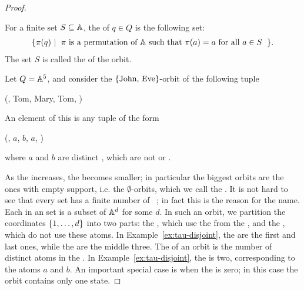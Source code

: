 \begin{proof}
\begin{definition}[Orbit] \label{def:orbit}
  \AP
  For a finite set $S \subseteq \mathbb A$, the  of $q \in Q$ is the following set:
    \begin{align*}
    \setbuild{ \pi(q)}{$\pi$ is a permutation of $\atoms$ such that $\pi(a)=a$ for all $a \in S$}.
    \end{align*}
  The set $S$ is called the  of the orbit.
\end{definition}

\begin{myexample}\label{ex:tau-disjoint}
    Let $Q = \mathbb A^5$, and consider the $\{\text{{John}, {Eve}}\}$-orbit of the following tuple
    \begin{center}
        (, Tom, Mary, Tom, )
    \end{center}
    An element of this  is any tuple of the form 
    \begin{center}
        (, $a$, $b$, $a$, )
    \end{center}
    where $a$ and $b$ are distinct , which are not  or . 
\end{myexample}

\AP As the  increases, the  becomes smaller; in
particular the biggest orbits are the ones with empty support, i.e. the
$\emptyset$-orbits, which we call the . It is not
hard to see that every  set has a finite number of
~\cite[Lemma 1.4]{bojanczyk_slightly}; in fact this is
the reason for the name. Each  in an  set is a
subset of $\mathbb A^d$ for some $d$. In such an orbit, we partition the
coordinates $\{1,\ldots,d\}$ into two parts: the ,
which use the  from the , and the , which do not use these atoms. In Example~\ref{ex:tau-disjoint},
the  are  the first and last ones, while the  are the middle three. The  of an
orbit is the number of distinct atoms in the . In
Example~\ref{ex:tau-disjoint}, the  is two,
corresponding to the atoms $a$ and $b$. An important special case is when the
 is zero; in this case the orbit contains only one state.


\end{proof}
